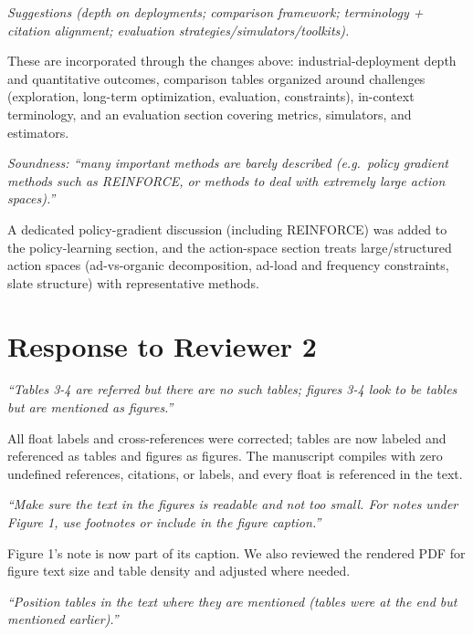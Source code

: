 \documentclass[11pt]{article}
\newenvironment{revcomment}
  {\par\smallskip\noindent\begin{list}{}{%
      \setlength{\leftmargin}{1.5em}\setlength{\rightmargin}{1em}}%
   \item\itshape\color{black!75}}
  {\end{list}\par\smallskip}
\begin{document}
\begin{revcomment}
Suggestions (depth on deployments; comparison framework; terminology +
citation alignment; evaluation strategies/simulators/toolkits).
\end{revcomment}

These are incorporated through the changes above: industrial-deployment depth
and quantitative outcomes, comparison tables organized around challenges
(exploration, long-term optimization, evaluation, constraints), in-context
terminology, and an evaluation section covering metrics, simulators, and
estimators.

\begin{revcomment}
Soundness: ``many important methods are barely described (e.g.\ policy gradient
methods such as REINFORCE, or methods to deal with extremely large action
spaces).''
\end{revcomment}

A dedicated policy-gradient discussion (including REINFORCE) was added to the
policy-learning section, and the action-space section treats large/structured
action spaces (ad-vs-organic decomposition, ad-load and frequency constraints,
slate structure) with representative methods.

\section*{Response to Reviewer 2}

\begin{revcomment}
``Tables 3-4 are referred but there are no such tables; figures 3-4 look to be
tables but are mentioned as figures.''
\end{revcomment}

All float labels and cross-references were corrected; tables are now labeled and
referenced as tables and figures as figures. The manuscript compiles with zero
undefined references, citations, or labels, and every float is referenced in the
text.

\begin{revcomment}
``Make sure the text in the figures is readable and not too small. For notes
under Figure 1, use footnotes or include in the figure caption.''
\end{revcomment}

Figure 1's note is now part of its caption. We also reviewed the rendered PDF
for figure text size and table density and adjusted where needed.

\begin{revcomment}
``Position tables in the text where they are mentioned (tables were at the end
but mentioned earlier).''
\end{revcomment}
\end{document}
